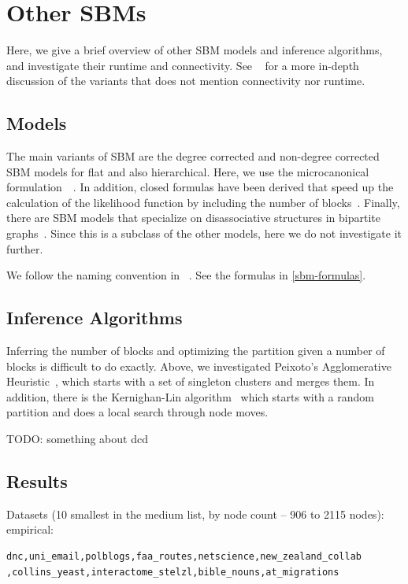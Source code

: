 \documentclass[aps,pre,superscriptaddress]{revtex4}
\begin{document}
\section{Other SBMs}

Here, we give a brief overview of other SBM models and inference algorithms, and investigate their runtime and connectivity.
See ~\cite{funke19-04} for a more in-depth discussion of the variants that does not mention connectivity nor runtime.

\subsection*{Models}

The main variants of SBM are the degree corrected and non-degree corrected SBM models for flat and also hierarchical.
Here, we use the microcanonical formulation~\cite{peixoto17-01}~\cite{peixoto14-03}.
In addition, closed formulas have been derived that speed up the calculation of the likelihood function by including the number of blocks~\cite{come15-12}.
Finally, there are SBM models that specialize on disassociative structures in bipartite graphs~\cite{yen20-09}.
Since this is a subclass of the other models, here we do not investigate it further.

We follow the naming convention in ~\cite{funke19-04}.
See the formulas in \ref{sbm-formulas}.

\subsection*{Inference Algorithms}

Inferring the number of blocks and optimizing the partition given a number of blocks is difficult to do exactly.
Above, we investigated Peixoto's Agglomerative Heuristic~\cite{peixoto14-01}, which starts with a set of singleton clusters and merges them.
In addition, there is the Kernighan-Lin algorithm~\cite{kernighan70-02} which starts with a random partition and does a local search through node moves.

TODO: something about dcd

\subsection*{Results}

Datasets (10 smallest in the medium list, by node count -- 906 to 2115 nodes):
empirical:
\begin{verbatim}
dnc,uni_email,polblogs,faa_routes,netscience,new_zealand_collab
,collins_yeast,interactome_stelzl,bible_nouns,at_migrations    
\end{verbatim}
\end{document}
